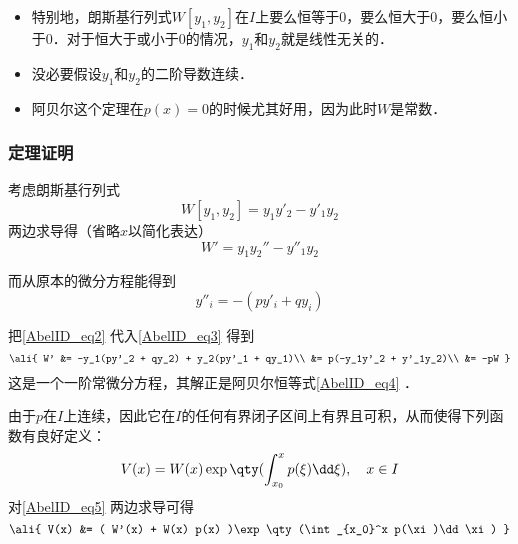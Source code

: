 \begin{itemize}
\item 特别地，朗斯基行列式$W[y_1, y_2]$在$I$上要么恒等于$0$，要么恒大于$0$，要么恒小于$0$．对于恒大于或小于$0$的情况，$y_1$和$y_2$就是线性无关的．
\item 没必要假设$y_1$和$y_2$的二阶导数连续．
\item 阿贝尔这个定理在$p(x)=0$的时候尤其好用，因为此时$W$是常数．
\end{itemize}


\subsubsection{定理证明}

考虑朗斯基行列式
\begin{equation}
W[y_1, y_2] = y_1y'_2 - y'_1y_2
\end{equation}
两边求导得（省略$x$以简化表达）
\begin{equation}\label{AbelID_eq3}
W' = y_1y_2'' - y''_1y_2
\end{equation}

而从原本的微分方程能得到
\begin{equation}\label{AbelID_eq2}
y''_i = -(py'_i+qy_i)
\end{equation}

把\autoref{AbelID_eq2} 代入\autoref{AbelID_eq3} 得到
\begin{equation}
\ali{
    W' &= -y_1(py'_2 + qy_2) + y_2(py'_1 + qy_1)\\
    &= p(-y_1y'_2 + y'_1y_2)\\
    &= -pW
}
\end{equation}
这是一个一阶常微分方程，其解正是阿贝尔恒等式\autoref{AbelID_eq4} ．

由于$p$在$I$上连续，因此它在$I$的任何有界闭子区间上有界且可积，从而使得下列函数有良好定义：
\begin{equation}\label{AbelID_eq5}
V(x) = W(x) \exp\qty(\int_{x_0}^x p(\xi)\dd \xi),\quad x\in I
\end{equation}
对\autoref{AbelID_eq5} 两边求导可得
\begin{equation}
\ali{
    V(x) &= ( W'(x) + W(x) p(x) )\exp\qty(\int_{x_0}^x p(\xi)\dd \xi)
}
\end{equation}












